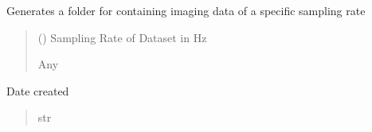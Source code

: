 \documentclass[letterpaper,10pt,english]{sphinxmanual}
\begin{document}
\begin{fulllineitems}
\begin{fulllineitems}
\label{\detokenize{ExperimentHierarchy:ExperimentHierarchy.ExperimentStage.add_image_sampling_folder}}
\pysigstartsignatures
{}
\pysigstopsignatures
\sphinxAtStartPar
Generates a folder for containing imaging data of a specific sampling rate
\begin{quote}\begin{description}
\sphinxAtStartPar
{} () \textendash{} Sampling Rate of Dataset in Hz

\sphinxAtStartPar
Any

\end{description}\end{quote}

\end{fulllineitems}


\begin{fulllineitems}
\label{\detokenize{ExperimentHierarchy:ExperimentHierarchy.ExperimentStage.instance_date}}
\pysigstartsignatures
{}
\pysigstopsignatures
\sphinxAtStartPar
Date created
\begin{quote}\begin{description}
\sphinxAtStartPar
str

\end{description}\end{quote}

\end{fulllineitems}



\end{fulllineitems}
\end{document}
